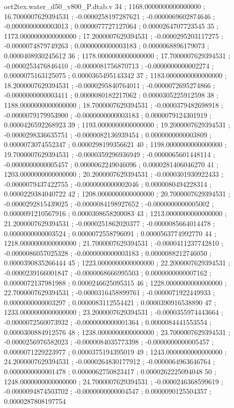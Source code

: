 \begin{filecontents}[overwrite]{oct2tex.water_d50_v800_P.dtab.v}
34 ; 1168.0000000000000000 ; 16.7000007629394531 ; -0.0000258197287621 ; -0.0000069602874646 ; -0.0000000000003013 ; 0.0000077727127064 ; 0.0000264707723545
35 ; 1173.0000000000000000 ; 17.2000007629394531 ; -0.0000295203117275 ; -0.0000074879749263 ; 0.0000000000003183 ; 0.0000068896179073 ; 0.0000408930245612
36 ; 1178.0000000000000000 ; 17.7000007629394531 ; -0.0000253476846410 ; -0.0000081756870713 ; -0.0000000000002274 ; 0.0000075163125075 ; 0.0000365495143342
37 ; 1183.0000000000000000 ; 18.2000007629394531 ; -0.0000295840764011 ; -0.0000072695274866 ; -0.0000000000003411 ; 0.0000080182217062 ; 0.0000305225912598
38 ; 1188.0000000000000000 ; 18.7000007629394531 ; -0.0000379482698918 ; -0.0000079179953900 ; -0.0000000000003183 ; 0.0000079124301919 ; 0.0000426592268923
39 ; 1193.0000000000000000 ; 19.2000007629394531 ; -0.0000298336635751 ; -0.0000082136939454 ; 0.0000000000003809 ; 0.0000073074552347 ; 0.0000298199356621
40 ; 1198.0000000000000000 ; 19.7000007629394531 ; -0.0000359296936949 ; -0.0000065601448114 ; -0.0000000000005457 ; 0.0000062249046096 ; 0.0000281406046270
41 ; 1203.0000000000000000 ; 20.2000007629394531 ; -0.0000301930922433 ; -0.0000079437422755 ; -0.0000000000002046 ; 0.0000080494228314 ; 0.0000229384040722
42 ; 1208.0000000000000000 ; 20.7000007629394531 ; -0.0000292815439025 ; -0.0000084198927652 ; -0.0000000000005002 ; 0.0000091210567916 ; 0.0000308658200083
43 ; 1213.0000000000000000 ; 21.2000007629394531 ; -0.0000251862020377 ; -0.0000085664014478 ; 0.0000000000003524 ; 0.0000072558796091 ; 0.0000563774992770
44 ; 1218.0000000000000000 ; 21.7000007629394531 ; -0.0000411237742810 ; -0.0000086057025328 ; -0.0000000000003183 ; 0.0000088212746050 ; 0.0000390835266444
45 ; 1223.0000000000000000 ; 22.2000007629394531 ; -0.0000239166001847 ; -0.0000068666995503 ; 0.0000000000007162 ; 0.0000072137981988 ; 0.0000246625095315
46 ; 1228.0000000000000000 ; 22.7000007629394531 ; -0.0000316458899761 ; -0.0000071922449933 ; 0.0000000000003297 ; 0.0000083112554421 ; 0.0000390916538890
47 ; 1233.0000000000000000 ; 23.2000007629394531 ; -0.0000355974443664 ; -0.0000072560073932 ; -0.0000000000001364 ; 0.0000084441553554 ; 0.0000300884912576
48 ; 1238.0000000000000000 ; 23.7000007629394531 ; -0.0000256976582023 ; -0.0000084035773398 ; -0.0000000000005457 ; 0.0000071229223977 ; 0.0000375194395019
49 ; 1243.0000000000000000 ; 24.2000007629394531 ; -0.0000264830177912 ; -0.0000064963646764 ; 0.0000000000001478 ; 0.0000062750823417 ; 0.0000262225094048
50 ; 1248.0000000000000000 ; 24.7000007629394531 ; -0.0000246368599619 ; -0.0000094874503702 ; -0.0000000000004547 ; 0.0000090125504357 ; 0.0000287808197754

\end{filecontents}
